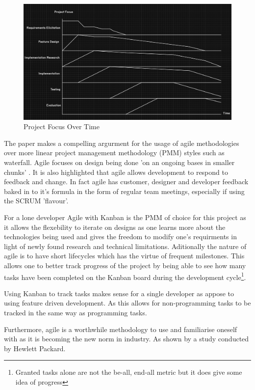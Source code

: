   \begin{figure}
    \begin{center}
      \includegraphics[scale=0.4]{Images/ProjectFocus2}
      \caption{Project Focus Over Time}
      \label{fig:project focus}
    \end{center}
  \end{figure}

  The paper \citep{Highsmith2001} makes a compelling argurment for the usage of agile methodologies over more linear project management methodology (PMM) styles such as waterfall. Agile focuses on design being done 'on an ongoing bases in smaller chunks' \citep{Highsmith2001}. It is also highlighted that agile allows development to respond to feedback and change. In fact agile has customer, designer and developer feedback baked in to it's formula in the form of regular team meetings, especially if using the SCRUM 'flavour'.
  \par
  For a lone developer Agile with Kanban is the PMM of choice for this project as it allows the flexebility to iterate on designs as one learns more about the technologies being used and gives the freedom to modify one's requirments in light of newly found research and technical limitations. Aditionally the nature of agile is to have short lifecycles which has the virtue of frequent milestones. This allows one to better track progress of the project by being able to see how many tasks have been completed on the Kanban board during the development cycle\footnote[4]{Granted tasks alone are not the be-all, end-all metric but it does give some idea of progress}.
  \par
  Using Kanban to track tasks makes sense for a single developer as appose to using feature driven development. As this allows for non-programming tasks to be tracked in the same way as programming tasks.
  \par
  Furthermore, agile is a worthwhile methodology to use and familiarise oneself with as it is becoming the new norm in industry. As shown by a study conducted by Hewlett Packard.

